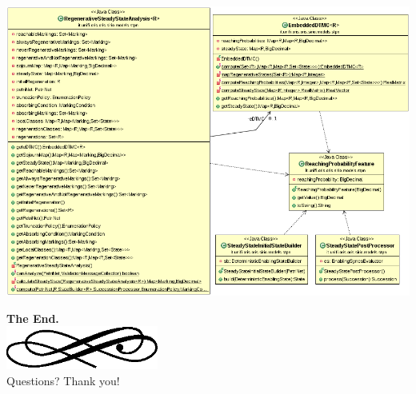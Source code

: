 \begin{frame}
  \begin{center}
    \includegraphics[width=\textwidth]{img/uml.png}
  \end{center}
\end{frame}

\begin{frame}
  \begin{center}
	\textbf{\calligra\Huge The End.}\\
  \includegraphics[width=5cm]{img/ornament.eps}\\[1cm]
	\pause
	{\huge\calligra Questions?\pause{} Thank you!}
  \end{center}
\end{frame}
